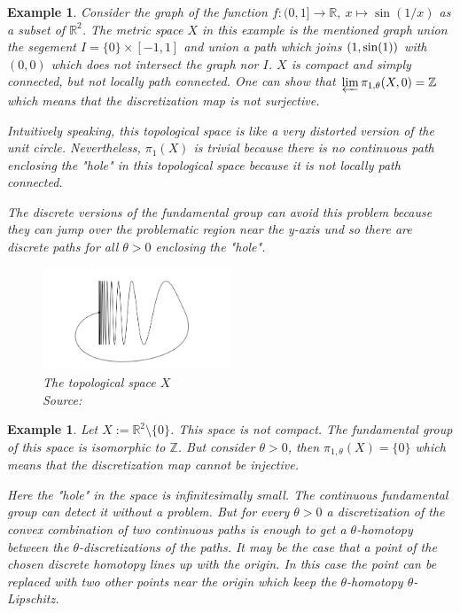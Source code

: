 \documentclass[a4paper, 11pt, twoside]{article}
\newcommand{\R}[0]{\mathbb{R}}
\theoremstyle{break}
\theoremstyle{break}
\newtheorem{ex}[thm]{Example}
\begin{document}
\begin{ex}
  Consider the graph of the function $f\colon (0, 1] \to \R, \: x \mapsto \sin(1/x)$ as a subset of $\R^2$. 
  The metric space $X$ in this example is the mentioned graph union the segement $I = \{0\} \times [-1, 1]$ and union a path which joins $(1, {\rm sin}(1))$ with $(0, 0)$ 
  which does not intersect the graph nor $I$.
  $X$ is compact and simply connected, but not locally path connected.
  One can show that $\varprojlim \pi_{1,\theta}(X, 0) = \mathbb{Z}$ which means that the discretization map is not surjective.

  Intuitively speaking, this topological space is like a very distorted version of the unit circle. 
  Nevertheless, $\pi_1(X)$ is trivial because there is no continuous path enclosing the "hole" in this topological space because it is not locally path connected.
  
  The discrete versions of the fundamental group can avoid this problem because they can jump over the problematic region near the y-axis und so there are discrete paths for all 
  $\theta > 0$ enclosing the "hole".
  
  \begin{figure}[ht!]
    \centering
    \includegraphics[width=0.5\textwidth]{ex1.png}
    \caption{The topological space $X$ \\ Source: \cite[p. 8]{vigolo2018fundamental}}
  \end{figure}
\end{ex}

\begin{ex}
  Let $X := \R^2 \setminus \{0\}$. This space is not compact. The fundamental group of this space is isomorphic to $\mathbb{Z}$. 
  But consider $\theta > 0$, then $\pi_{1,\theta}(X) = \{0\}$ which means that the discretization map cannot be injective.

  Here the "hole" in the space is infinitesimally small. The continuous fundamental group can detect it without a problem. 
  But for every $\theta > 0$ a discretization of the convex combination of two continuous paths is enough to get a $\theta$-homotopy between the 
  $\theta$-discretizations of the paths.
  It may be the case that a point of the chosen discrete homotopy lines up with the origin.
  In this case the point can be replaced with two other points near the origin which keep the $\theta$-homotopy $\theta$-Lipschitz.  
\end{ex}

\clearpage

\end{document}
